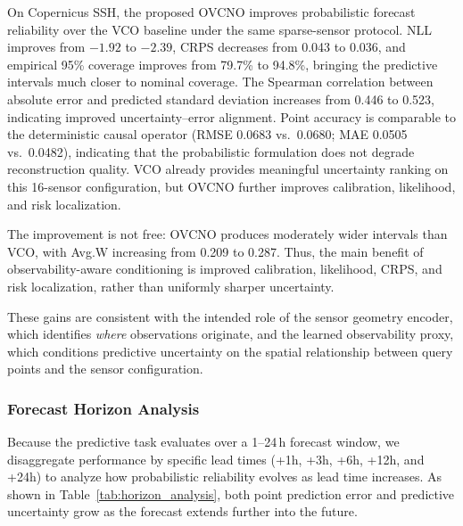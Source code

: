 \documentclass[11pt,a4paper]{article}
\begin{document}
On Copernicus SSH, the proposed OVCNO improves probabilistic forecast reliability over the VCO baseline under the same sparse-sensor protocol. NLL improves from $-1.92$ to $-2.39$, CRPS decreases from 0.043 to 0.036, and empirical 95\% coverage improves from 79.7\% to 94.8\%, bringing the predictive intervals much closer to nominal coverage. The Spearman correlation between absolute error and predicted standard deviation increases from 0.446 to 0.523, indicating improved uncertainty--error alignment. Point accuracy is comparable to the deterministic causal operator (RMSE 0.0683 vs.\ 0.0680; MAE 0.0505 vs.\ 0.0482), indicating that the probabilistic formulation does not degrade reconstruction quality. VCO already provides meaningful uncertainty ranking on this 16-sensor configuration, but OVCNO further improves calibration, likelihood, and risk localization.

The improvement is not free: OVCNO produces moderately wider intervals than VCO, with Avg.W increasing from 0.209 to 0.287. Thus, the main benefit of observability-aware conditioning is improved calibration, likelihood, CRPS, and risk localization, rather than uniformly sharper uncertainty.

These gains are consistent with the intended role of the sensor geometry encoder, which identifies \emph{where} observations originate, and the learned observability proxy, which conditions predictive uncertainty on the spatial relationship between query points and the sensor configuration.

\subsubsection{Forecast Horizon Analysis}

Because the predictive task evaluates over a 1--24\,h forecast window, we disaggregate performance by specific lead times (+1h, +3h, +6h, +12h, and +24h) to analyze how probabilistic reliability evolves as lead time increases. As shown in Table~\ref{tab:horizon_analysis}, both point prediction error and predictive uncertainty grow as the forecast extends further into the future.
\end{document}
